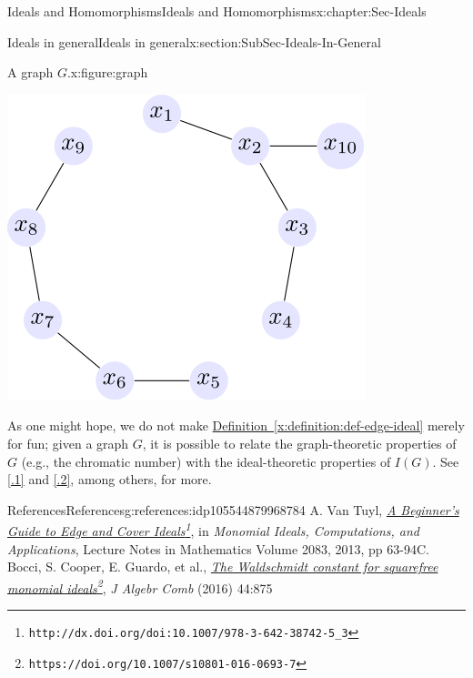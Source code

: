 \documentclass[oneside,10pt,]{book}
\newcommand{\xreffont}{\relax}
\numberwithin{equation}{section}
\begin{document}
\begin{chapterptx}{Ideals and Homomorphisms}{}{Ideals and Homomorphisms}{}{}{x:chapter:Sec-Ideals}
\begin{sectionptx}{Ideals in general}{}{Ideals in general}{}{}{x:section:SubSec-Ideals-In-General}
\begin{figureptx}{A graph \(G\).}{x:figure:graph}{}
\begin{image}{0.25}{0.5}{0.25}
\includegraphics[width=\linewidth]{./images/graph.svg}
\end{image}%
\tcblower
\end{figureptx}%
As one might hope, we do not make \hyperref[x:definition:def-edge-ideal]{Definition~{\xreffont\ref{x:definition:def-edge-ideal}}} merely for fun; given a graph \(G\), it is possible to relate the graph-theoretic properties of \(G\) (e.g., the chromatic number) with the ideal-theoretic properties of \(I(G)\). See \hyperlink{x:biblio:vantuyl-intro}{[{\xreffont 4.1.1}]} and \hyperlink{x:biblio:mfo-waldschmidt}{[{\xreffont 4.1.2}]}, among others, for more.%
%
%
\typeout{************************************************}
\typeout{************************************************}
%
\begin{references-subsection-numberless}{References}{}{References}{}{}{g:references:idp105544879968784}
A. Van Tuyl, \emph{\href{http://dx.doi.org/doi:10.1007/978-3-642-38742-5_3}{A Beginner's Guide to Edge and Cover Ideals}\footnote{\nolinkurl{http://dx.doi.org/doi:10.1007/978-3-642-38742-5_3}\label{g:fn:idp105544879970192}}}, in \emph{Monomial Ideals, Computations, and Applications}, Lecture Notes in Mathematics Volume 2083, 2013, pp 63-94C. Bocci, S. Cooper, E. Guardo, et al., \emph{\href{https://doi.org/10.1007/s10801-016-0693-7}{The Waldschmidt constant for squarefree monomial ideals}\footnote{\nolinkurl{https://doi.org/10.1007/s10801-016-0693-7}\label{g:fn:idp105544879971856}}}, \emph{J Algebr Comb} (2016) 44:875\end{references-subsection-numberless}

\end{sectionptx}
\end{chapterptx}
\end{document}
